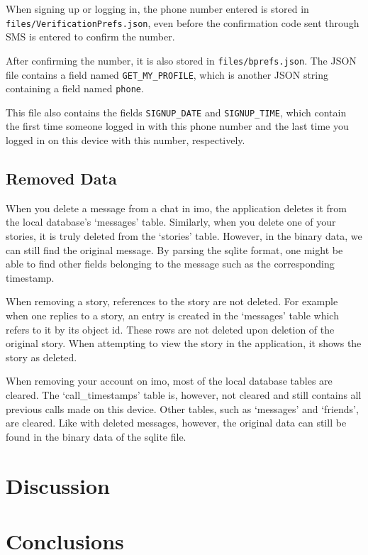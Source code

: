 \documentclass[conference]{IEEEtran}
\begin{document}
When signing up or logging in, the phone number entered is stored in
\texttt{files/VerificationPrefs.json}, even before the confirmation code sent
through SMS is entered to confirm the number.

After confirming the number, it is also stored in \texttt{files/bprefs.json}.
The JSON file contains a field named \texttt{GET\_MY\_PROFILE}, which is another
JSON string containing a field named \texttt{phone}.

This file also contains the fields \texttt{SIGNUP\_DATE} and
\texttt{SIGNUP\_TIME}, which contain the first time someone logged in with this
phone number and the last time you logged in on this device with this number,
respectively.


\subsection{Removed Data}

When you delete a message from a chat in imo, the application deletes it from
the local database's `messages' table. Similarly, when you delete one of your
stories, it is truly deleted from the `stories' table. However, in the binary
data, we can still find the original message. By parsing the sqlite format, one
might be able to find other fields belonging to the message such as the
corresponding timestamp.

When removing a story, references to the story are not deleted. For example
when one replies to a story, an entry is created in the `messages' table which
refers to it by its object id. These rows are not deleted upon deletion of the
original story. When attempting to view the story in the application, it shows
the story as deleted.

When removing your account on imo, most of the local database tables are
cleared. The `call\_timestamps' table is, however, not cleared and still
contains all previous calls made on this device. Other tables, such as
`messages' and `friends', are cleared. Like with deleted messages, however, the
original data can still be found in the binary data of the sqlite file.

\section{Discussion}

\section{Conclusions}
\end{document}
